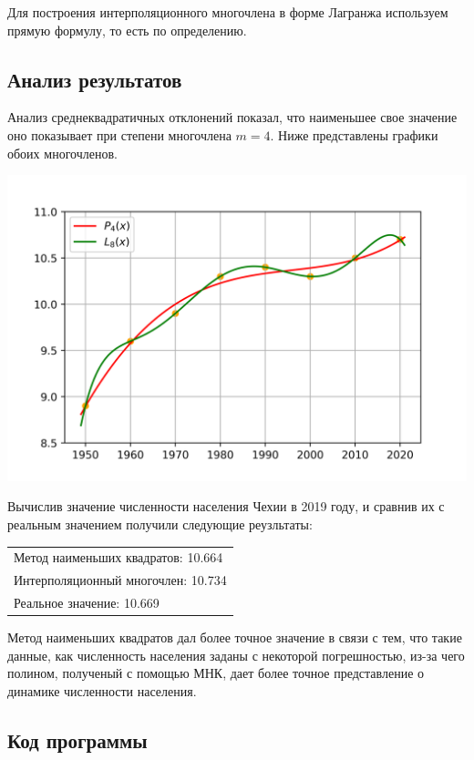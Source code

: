 Для построения интерполяционного многочлена в форме Лагранжа используем прямую формулу, то есть по определению.

\subsection*{Анализ результатов}

Анализ среднеквадратичных отклонений показал, что наименьшее свое значение оно показывает при степени многочлена $m = 4$. Ниже представлены графики обоих многочленов.

\noindent
\includegraphics{images/plot_4.1.png}

Вычислив значение численности населения Чехии в 2019 году, и сравнив их с реальным значением получили следующие реузльтаты:

\begin{tabular}{l}
	Метод наименьших квадратов: 10.664 \\
	Интерполяционный многочлен: 10.734 \\
	Реальное значение: 10.669 \\
\end{tabular}

Метод наименьших квадратов дал более точное значение в связи с тем, что такие данные, как численность населения заданы с некоторой погрешностью, из-за чего полином, полученый с помощью МНК, дает более точное представление о динамике численности населения.
\newpage
\subsection*{Код программы}

